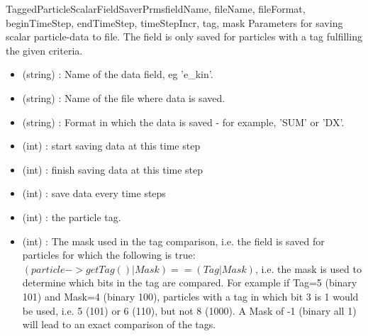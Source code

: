 \documentclass{manual}
\begin{document}
\begin{classdesc}{TaggedParticleScalarFieldSaverPrms}{fieldName, fileName, fileFormat, beginTimeStep, endTimeStep, timeStepIncr, tag, mask}
Parameters for saving scalar particle-data to file. The field is only saved for particles with a tag fulfilling the given criteria.
\begin{itemize}
\item {} (string) : Name of the data field, eg 'e_kin'.
\item {} (string) : Name of the file where data is saved.
\item {} (string) : Format in which the data is saved - for example, 'SUM' or 'DX'.
\item {} (int) : start saving data at this time step
\item {} (int) : finish saving data at this time step
\item {} (int) : save data every  time steps
\item {} (int) :  the particle tag.
\item {} (int) : The mask used in the tag comparison, i.e. the field is saved for particles for which the following is true: $(particle->getTag() | Mask ) == (Tag | Mask)$, i.e. the mask is used to determine which bits in the tag are compared. For example if Tag=5 (binary 101) and Mask=4 (binary 100), particles with a tag in which bit 3 is 1 would be used, i.e. 5 (101) or 6 (110), but not 8 (1000). A Mask of -1 (binary all 1) will lead to an exact comparison of the tags.
\end{itemize}
\end{classdesc}
\end{document}
